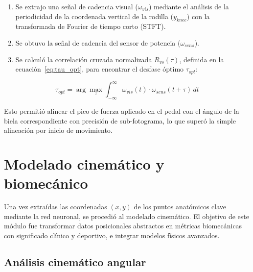 \begin{enumerate}
  \item Se extrajo una señal de cadencia visual ($\omega_{vis}$) mediante el análisis
        de la periodicidad de la coordenada vertical de la rodilla ($y_{knee}$) con la
        transformada de Fourier de tiempo corto (STFT).
  \item Se obtuvo la señal de cadencia del sensor de potencia ($\omega_{sens}$).
  \item Se calculó la correlación cruzada normalizada $R_{vs}(\tau)$, definida en la ecuación~\ref{eq:tau_opt}, para encontrar el
        desfase óptimo $\tau_{opt}$:
\end{enumerate}

\begin{equation}
  \label{eq:tau_opt}
  \tau_{opt} = \arg \max_{\tau} \int_{-\infty}^{\infty} \omega_{vis}(t) \cdot \omega_{sens}(t+\tau) \, dt
\end{equation}

Esto permitió alinear el pico de fuerza aplicado en el pedal con el ángulo de
la biela correspondiente con precisión de sub-fotograma, lo que superó la
simple alineación por inicio de movimiento.

\section{Modelado cinemático y biomecánico}
\label{sec:modelado_cinematico}

Una vez extraídas las coordenadas $(x, y)$ de los puntos anatómicos clave
mediante la red neuronal, se procedió al modelado cinemático. El objetivo de
este módulo fue transformar datos posicionales abstractos en métricas
biomecánicas con significado clínico y deportivo, e integrar modelos físicos
avanzados.

\subsection{Análisis cinemático angular}
\label{subsec:cinematica_angular}

